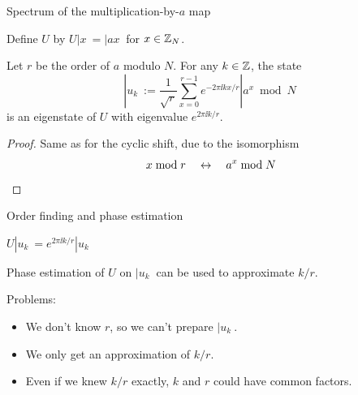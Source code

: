 
\begin{frame}{Spectrum of the multiplication-by-$a$ map}

Define $U$ by $U|x\> = |ax\>$ for $x \in {\mathbb{Z}}_N$.

\pause
\bigskip

\claim
  Let $r$ be the order of $a$ modulo $N$.  For any $k \in {\mathbb{Z}}$, the state
  \[ |u_k\> := \frac{1}{\sqrt r}\sum_{x=0}^{r-1}e^{-2\pi\ii kx/r} |a^x \bmod N\> \]
  is an eigenstate of $U$ with eigenvalue $e^{2\pi\ii k/r}$.

\pause
\bigskip

\begin{proof}
Same as for the cyclic shift, due to the isomorphism
\[
  x \bmod r \quad\leftrightarrow\quad a^x \bmod N \qedhere
\]
\end{proof}

\end{frame}


\begin{frame}{Order finding and phase estimation}

$U|u_k\> = e^{2\pi \ii k/r} |u_k\>$

\bigskip

Phase estimation of $U$ on $|u_k\>$ can be used to approximate $k/r$.

\pause
\bigskip
\bigskip

Problems:
  \begin{itemize}
    \item We don't know $r$, so we can't prepare $|u_k\>$.
    \item We only get an approximation of $k/r$.
    \item Even if we knew $k/r$ exactly, $k$ and $r$ could have common factors.
  \end{itemize}
\end{frame}


